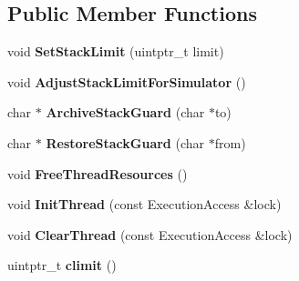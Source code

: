 \subsection*{Public Member Functions}
\begin{DoxyCompactItemize}
\item 
void {\bfseries Set\+Stack\+Limit} (uintptr\+\_\+t limit)\hypertarget{classv8_1_1internal_1_1_stack_guard_add078da8ff9bcd4399cab789d7695c1e}{}\label{classv8_1_1internal_1_1_stack_guard_add078da8ff9bcd4399cab789d7695c1e}

\item 
void {\bfseries Adjust\+Stack\+Limit\+For\+Simulator} ()\hypertarget{classv8_1_1internal_1_1_stack_guard_a53aa0f69625811650130f267817608d1}{}\label{classv8_1_1internal_1_1_stack_guard_a53aa0f69625811650130f267817608d1}

\item 
char $\ast$ {\bfseries Archive\+Stack\+Guard} (char $\ast$to)\hypertarget{classv8_1_1internal_1_1_stack_guard_acb831b60589eedfbe0087a9cb4260efe}{}\label{classv8_1_1internal_1_1_stack_guard_acb831b60589eedfbe0087a9cb4260efe}

\item 
char $\ast$ {\bfseries Restore\+Stack\+Guard} (char $\ast$from)\hypertarget{classv8_1_1internal_1_1_stack_guard_ae5e81ec252c44746fe9049c6c76afcbb}{}\label{classv8_1_1internal_1_1_stack_guard_ae5e81ec252c44746fe9049c6c76afcbb}

\item 
void {\bfseries Free\+Thread\+Resources} ()\hypertarget{classv8_1_1internal_1_1_stack_guard_af3c0e7861b527d914570aacda023acff}{}\label{classv8_1_1internal_1_1_stack_guard_af3c0e7861b527d914570aacda023acff}

\item 
void {\bfseries Init\+Thread} (const Execution\+Access \&lock)\hypertarget{classv8_1_1internal_1_1_stack_guard_a3738bc365765124e5a3ee6e7fe52be7b}{}\label{classv8_1_1internal_1_1_stack_guard_a3738bc365765124e5a3ee6e7fe52be7b}

\item 
void {\bfseries Clear\+Thread} (const Execution\+Access \&lock)\hypertarget{classv8_1_1internal_1_1_stack_guard_aaaed1b1e86d64b224773098285b65535}{}\label{classv8_1_1internal_1_1_stack_guard_aaaed1b1e86d64b224773098285b65535}

\item 
uintptr\+\_\+t {\bfseries climit} ()\hypertarget{classv8_1_1internal_1_1_stack_guard_a3fc7c4f7b03f04254e545670a0708e9b}{}\label{classv8_1_1internal_1_1_stack_guard_a3fc7c4f7b03f04254e545670a0708e9b}


\end{DoxyCompactItemize}
